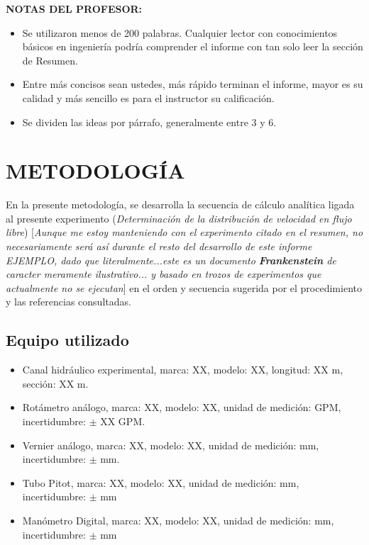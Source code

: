 \documentclass[11pt, letterpaper]{article}
\begin{document}
\textbf{NOTAS DEL PROFESOR:}

\begin{itemize}
\item Se utilizaron menos de 200 palabras. Cualquier lector con conocimientos básicos en ingeniería podría comprender el informe con tan solo leer la sección de Resumen.
\item Entre más concisos sean ustedes, más rápido terminan el informe, mayor es su calidad y más sencillo es para el instructor su calificación.
\item Se dividen las ideas por párrafo, generalmente entre 3 y 6.
\end{itemize}

\pagebreak

\section{METODOLOGÍA}

En la presente metodología, se desarrolla la secuencia de cálculo analítica ligada al presente experimento (\emph{Determinación de la distribución de velocidad en flujo libre}) [\emph{Aunque me estoy manteniendo con el experimento citado en el resumen, no necesariamente será así durante el resto del desarrollo de este informe EJEMPLO, dado que literalmente...este es un documento \textbf{Frankenstein} de caracter meramente ilustrativo... y basado en trozos de experimentos que actualmente no se ejecutan}] en el orden y secuencia sugerida por el procedimiento y las referencias consultadas.\\

\subsection{Equipo utilizado}

\begin{itemize}
\item Canal hidráulico experimental, marca: XX, modelo: XX, longitud: XX m, sección: XX m.
\item Rotámetro análogo, marca: XX, modelo: XX, unidad de medición: GPM, incertidumbre: $\pm$ XX GPM.
\item Vernier análogo, marca: XX, modelo: XX, unidad de medición: mm, incertidumbre: $\pm$ mm.
\item Tubo Pitot, marca: XX, modelo: XX, unidad de medición: mm, incertidumbre: $\pm$ mm
\item Manómetro Digital, marca: XX, modelo: XX, unidad de medición: mm, incertidumbre: $\pm$ mm
\end{itemize}
\end{document}
